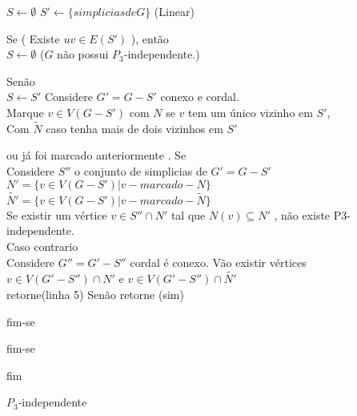 \documentclass[a4paper,8pt]{article}
\theoremstyle{plain}
\begin{document}
\begin{algorithm}[!htb] \label{alg:hn2}
	
	$S \leftarrow \emptyset$
    $S' \leftarrow \{simplicias de G\}$ (Linear)
	
	Se ( Existe $uv \in E(S')$ ), então \\
		
		$S \leftarrow \emptyset$ ($G$ não possui $P_3$-independente.)
		
	Senão \\
		$S \leftarrow S' $ 
	    Considere $G'=G-S'$ conexo e cordal.\\
    	Marque $v \in V(G-S')$ com $N$ se $v$ tem um único vizinho em $S'$,
    	\\
        Com $\tilde{N}$ caso tenha mais de dois vizinhos em $S'$
        
        ou já foi marcado anteriormente
        . 
    Se \\   
        Considere $S''$ o conjunto de simplicias de $G'=G-S'$ \\
        $N'=\{v \in V(G-S')| v -marcado- N\}$ \\
        $\tilde{N'}=\{v \in V(G-S')|  v -marcado-  \tilde{N}\}$ \\
       Se existir um vértice $v \in S''\cap N'$ tal que 
       $N(v)\subseteq N'$ , não existe P3-independente.\\
	  Caso contrario\\
	  Considere $G''=G'-S''$ cordal é conexo.
	  Vão existir vértices $v \in  V(G'-S'')\cap N'$ e
	  $v \in  V(G'-S'')\cap \tilde{N'}
	  $\\
	  retorne(linha 5) 
        Senão retorne (sim)
        
	fim-se
	
	fim-se
	
	fim
	\caption{$P_3$-independente}
	\label{alg:general2}
\end{algorithm}
\end{document}
